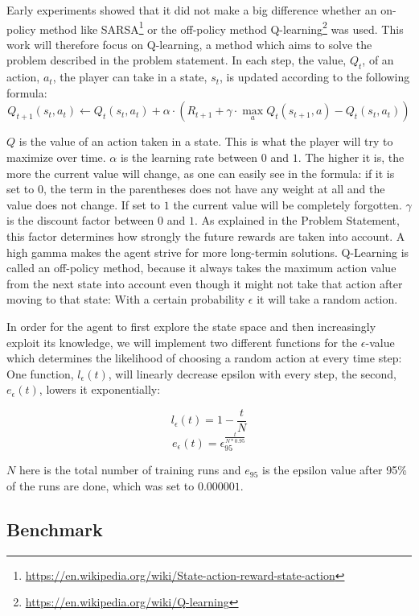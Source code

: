 \documentclass[a4paper,10pt]{article}
\begin{document}
Early experiments showed that it did not make a big difference whether an on-policy method like SARSA\footnote{\url{https://en.wikipedia.org/wiki/State-action-reward-state-action}} or the off-policy method Q-learning\footnote{\url{https://en.wikipedia.org/wiki/Q-learning}} was used.
This work will therefore focus on Q-learning, a method which aims to solve the problem described in the problem statement.
In each step, the value, $Q_t$, of an action, $a_t$, the player can take in a state, $s_t$, is updated according to the following formula:
\[Q_{t+1}(s_t, a_t) \leftarrow Q_t(s_t,a_t)+\alpha\cdot(R_{t+1}+\gamma\cdot\max_a Q_t(s_{t+1},a)-Q_t(s_t, a_t))\]

$Q$ is the value of an action taken in a state. This is what the player will try to maximize over time.
$\alpha$ is the learning rate between $0$ and $1$. The higher it is, the more the current value will change, as one can easily see in the formula: if it is set to $0$, the term in the parentheses does not have any weight at all and the value does not change.
If set to $1$ the current value will be completely forgotten.
$\gamma$ is the discount factor between $0$ and $1$. As explained in the Problem Statement, this factor determines how strongly the future rewards are taken into account. A high gamma makes the agent strive for more long-termin solutions.
Q-Learning is called an off-policy method, because it always takes the maximum action value from the next state into account even though it might not take that action after moving to that state:
With a certain probability $\epsilon$ it will take a random action.

In order for the agent to first explore the state space and then increasingly exploit its knowledge, we will implement two different functions for the $\epsilon$-value which determines the likelihood of choosing a random action at every time step:
One function, $l_\epsilon(t)$, will linearly decrease epsilon with every step, the second, $e_\epsilon(t)$, lowers it exponentially:

\[l_\epsilon(t) = 1 - \frac{t}{N}\]
\[e_\epsilon(t) = \epsilon_{95}^\frac{t}{N*0.95}\]

$N$ here is the total number of training runs and $e_{95}$ is the epsilon value after 95\% of the runs are done, which was set to $0.000001$.

\subsection{Benchmark}
\end{document}
